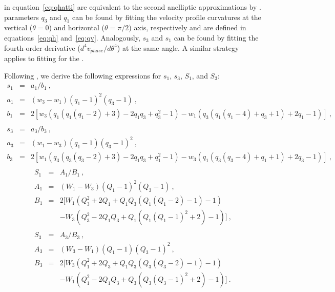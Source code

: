   in equation~\ref{eq:qhatti} are equivalent to the second anelliptic approximations by \cite{mdk}.  parameters $q_3$ and $q_1$ can be found by fitting the velocity profile curvatures at the vertical  ($\theta=0$) and horizontal ($\theta=\pi/2$) axis, respectively and are defined in equations~\ref{eq:qh} and~\ref{eq:qv}. Analogously, $s_3$ and $s_1$ can be found by fitting the fourth-order derivative ($d^4v_{phase}/d\theta^4$) at the same angle. A similar strategy applies to fitting  for the  . 


Following  , we derive the following expressions for $s_1$, $s_3$, $S_1$, and $S_3$:
\begin{eqnarray}
 \label{eq:s12}
 s_1 & = & a_{1}/b_{1}~, \\
 \nonumber
 a_{1} & = & (w_3-w_1)(q_1-1)^2(q_3-1)~, \\
 \nonumber
 b_{1}  & = & 2[w_3(q_1(q_1(q_1-2)+3)-2q_1q_3+q_3^2-1) - w_1(q_3(q_1(q_1-4)+q_3+1) +2q_1 -1 )]~,\\ \nonumber \\
  \label{eq:s32}
  s_3 & = & a_{3}/b_{3}~, \\
 \nonumber
 a_{3} & = & (w_1-w_3)(q_1-1)(q_3-1)^2~, \\
 \nonumber
 b_{3}  & = & 2[w_1(q_3(q_3(q_3-2)+3)-2q_1q_3+q_1^2-1) - w_3(q_1(q_3(q_3-4)+q_1+1) +2q_3 -1 )]~,\\ \nonumber
\end{eqnarray}
\begin{eqnarray}
 \label{eq:S12}
  S_1 & = & A_{1}/B_{1}~, \\
 \nonumber
 A_{1} & = & (W_1-W_3)(Q_1-1)^2(Q_3-1)~, \\
 \nonumber
 B_{1}  & = & 2[W_1(Q_3^2 +2Q_1 +Q_1Q_3(Q_1(Q_1-2)-1)-1) \\
 \nonumber
 	&   &- W_3(Q_3^2-2Q_1Q_3+Q_1(Q_1(Q_1-1)^2+2)-1)]~, \\ \nonumber \\
 \label{eq:S32}
 S_3 & = & A_{3}/B_{3}~, \\
 \nonumber
 A_{3} & = & (W_3-W_1)(Q_1-1)(Q_3-1)^2~, \\
 \nonumber
 B_{3}  & = & 2[W_3(Q_1^2 +2Q_3 +Q_1Q_3(Q_3(Q_3-2)-1)-1) \\
 \nonumber
 	&   & - W_1(Q_1^2-2Q_1Q_3+Q_3(Q_3(Q_3-1)^2+2)-1)]~.
\end{eqnarray}


